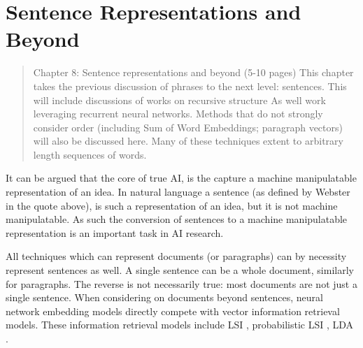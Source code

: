 \documentclass[12pt,parskip]{komatufte}
\begin{document}
\chapter{Sentence Representations and Beyond}\label{sec:sentence-representations-and-beyond}
\begin{abstract}
	Chapter 8: Sentence representations and beyond (5-10 pages)
	This chapter takes the previous discussion of phrases to the next level: sentences.
	This will include discussions of works on recursive structure
	As well work leveraging recurrent neural networks.
	Methods that do not strongly consider order (including Sum of Word Embeddings; paragraph vectors) will also be discussed here.
	Many of these techniques extent to arbitrary length sequences of words.
\end{abstract}


It can be argued that the core of true AI,
is the capture a machine manipulatable representation of an idea.
In natural language a sentence (as defined by Webster in the quote above),
is such a representation of an idea, but it is not machine manipulatable.
As such the conversion of sentences to a machine manipulatable representation is an important task in AI research.


All techniques which can represent documents (or paragraphs) can by necessity represent sentences as well.
A single sentence can be a whole document, similarly for paragraphs.
The reverse is not necessarily true: most documents are not just a single sentence.
When considering on documents beyond sentences,
neural network embedding models directly compete with vector information retrieval models.
These information retrieval models include LSI , probabilistic LSI ,  LDA .




\end{document}
